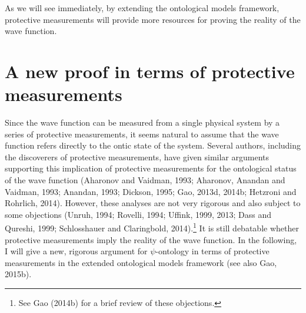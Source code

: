 As we will see immediately, by extending the ontological models framework, protective measurements will provide more resources for proving the reality of the wave function. 

\section{A new proof in terms of protective measurements}

Since the wave function can be measured from a single physical system by a series of protective measurements, it seems natural to assume that the wave function refers directly to the ontic state of the system. Several authors, including the discoverers of protective measurements, have given similar arguments supporting this implication of protective measurements for the ontological status of the wave function (Aharonov and Vaidman, 1993; Aharonov, Anandan and Vaidman, 1993; Anandan, 1993; Dickson, 1995; Gao, 2013d, 2014b; Hetzroni and Rohrlich, 2014). However, these analyses are not very rigorous and also subject to some objections (Unruh, 1994; Rovelli, 1994; Uffink, 1999, 2013; Dass and Qureshi, 1999; Schlosshauer and Claringbold, 2014).\footnote{See Gao (2014b) for a brief review of these objections.} It is still debatable whether protective measurements imply the reality of the wave function. In the following, I will give a new, rigorous argument for $\psi$-ontology in terms of protective measurements in the extended ontological models framework (see also Gao, 2015b).

